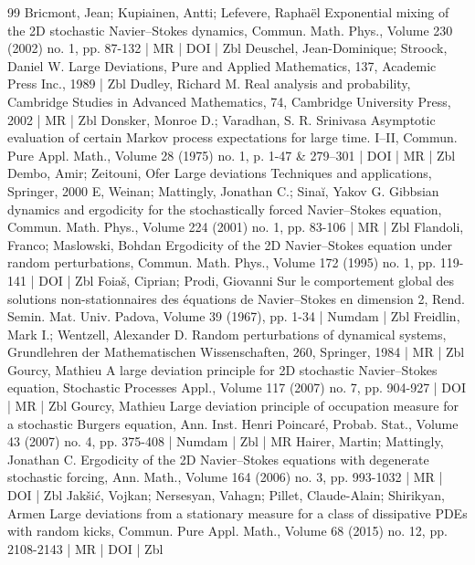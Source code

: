 \begin{thebibliography}{99}
Bricmont, Jean; Kupiainen, Antti; Lefevere, Raphaël Exponential mixing of the 2D stochastic Navier–Stokes dynamics, Commun. Math. Phys., Volume 230 (2002) no. 1, pp. 87-132 | MR | DOI | Zbl
Deuschel, Jean-Dominique; Stroock, Daniel W. Large Deviations, Pure and Applied Mathematics, 137, Academic Press Inc., 1989 | Zbl
Dudley, Richard M. Real analysis and probability, Cambridge Studies in Advanced Mathematics, 74, Cambridge University Press, 2002 | MR | Zbl
Donsker, Monroe D.; Varadhan, S. R. Srinivasa Asymptotic evaluation of certain Markov process expectations for large time. I–II, Commun. Pure Appl. Math., Volume 28 (1975) no. 1, p. 1-47 \& 279–301 | DOI | MR | Zbl
Dembo, Amir; Zeitouni, Ofer Large deviations Techniques and applications, Springer, 2000
E, Weinan; Mattingly, Jonathan C.; Sinaĭ, Yakov G. Gibbsian dynamics and ergodicity for the stochastically forced Navier–Stokes equation, Commun. Math. Phys., Volume 224 (2001) no. 1, pp. 83-106 | MR | Zbl
Flandoli, Franco; Maslowski, Bohdan Ergodicity of the 2D Navier–Stokes equation under random perturbations, Commun. Math. Phys., Volume 172 (1995) no. 1, pp. 119-141 | DOI | Zbl
Foiaš, Ciprian; Prodi, Giovanni Sur le comportement global des solutions non-stationnaires des équations de Navier–Stokes en dimension 2, Rend. Semin. Mat. Univ. Padova, Volume 39 (1967), pp. 1-34 | Numdam | Zbl
Freidlin, Mark I.; Wentzell, Alexander D. Random perturbations of dynamical systems, Grundlehren der Mathematischen Wissenschaften, 260, Springer, 1984 | MR | Zbl
Gourcy, Mathieu A large deviation principle for 2D stochastic Navier–Stokes equation, Stochastic Processes Appl., Volume 117 (2007) no. 7, pp. 904-927 | DOI | MR | Zbl
Gourcy, Mathieu Large deviation principle of occupation measure for a stochastic Burgers equation, Ann. Inst. Henri Poincaré, Probab. Stat., Volume 43 (2007) no. 4, pp. 375-408 | Numdam | Zbl | MR
Hairer, Martin; Mattingly, Jonathan C. Ergodicity of the 2D Navier–Stokes equations with degenerate stochastic forcing, Ann. Math., Volume 164 (2006) no. 3, pp. 993-1032 | MR | DOI | Zbl
Jakšić, Vojkan; Nersesyan, Vahagn; Pillet, Claude-Alain; Shirikyan, Armen Large deviations from a stationary measure for a class of dissipative PDEs with random kicks, Commun. Pure Appl. Math., Volume 68 (2015) no. 12, pp. 2108-2143 | MR | DOI | Zbl

\end{thebibliography}
